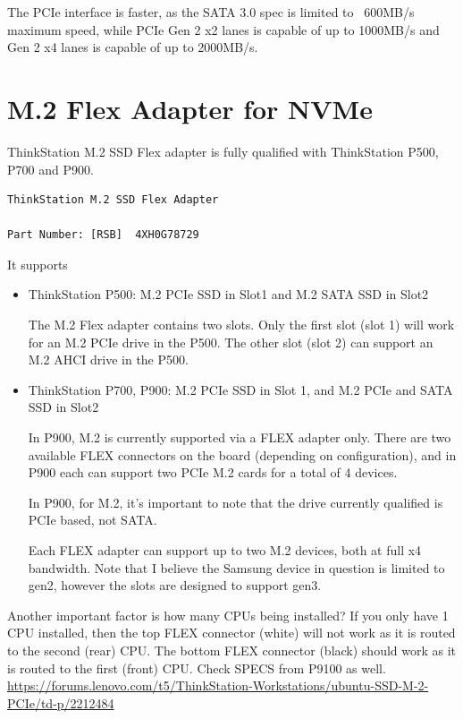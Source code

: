 The PCIe interface is faster, as the SATA 3.0 spec is limited to ~600MB/s
maximum speed, while PCIe Gen 2 x2 lanes is capable of up to 1000MB/s and Gen 2
x4 lanes is capable of up to 2000MB/s.

 

\section{M.2 Flex Adapter for NVMe}
\label{sec:M2-Flex-Adapter}

ThinkStation M.2 SSD Flex adapter is fully qualified with ThinkStation P500,
P700 and P900. 
\begin{verbatim}
ThinkStation M.2 SSD Flex Adapter

Part Number: [RSB]  4XH0G78729
\end{verbatim}
It supports 
\begin{itemize}
  \item  ThinkStation P500: M.2 PCIe SSD in Slot1 and M.2 SATA SSD in Slot2

The M.2 Flex adapter contains two slots.  Only the first slot (slot 1) will work
for an M.2 PCIe drive in the P500.  The other slot (slot 2) can support an M.2
AHCI drive in the P500.
  
  \item  ThinkStation P700, P900: M.2 PCIe SSD in Slot 1, and M.2 PCIe and SATA
  SSD in Slot2 
  
In P900, M.2 is currently supported via a FLEX adapter only.  There are two
available FLEX connectors on the board (depending on configuration), and in P900
each can support two PCIe M.2 cards for a total of 4 devices.

In P900, for M.2, it's important to note that the drive currently qualified is
PCIe based, not SATA.

Each FLEX adapter can support up to two M.2 devices, both at full x4 bandwidth. 
Note that I believe the Samsung device in question is limited to gen2, however
the slots are designed to support gen3.

\end{itemize}

Another important factor is how many CPUs being installed? If you only have 1
CPU installed, then the top FLEX connector (white) will not work as it is routed
to the second (rear) CPU.  The bottom FLEX connector (black) should work as it
is routed to the first (front) CPU.
Check SPECS from P9100 as well.
\url{https://forums.lenovo.com/t5/ThinkStation-Workstations/ubuntu-SSD-M-2-PCIe/td-p/2212484}


